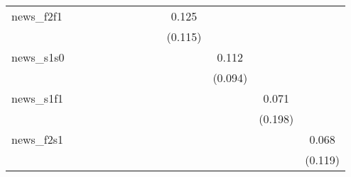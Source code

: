 {\begin{tabular}{l*{12}{c}}
\addlinespace
news\_f2f1   &                     &                     &                     &                     &                     &                     &                     &                     &       0.125         &                     &                     &                     \\
            &                     &                     &                     &                     &                     &                     &                     &                     &     (0.115)         &                     &                     &                     \\
\addlinespace
news\_s1s0   &                     &                     &                     &                     &                     &                     &                     &                     &                     &       0.112         &                     &                     \\
            &                     &                     &                     &                     &                     &                     &                     &                     &                     &     (0.094)         &                     &                     \\
\addlinespace
news\_s1f1   &                     &                     &                     &                     &                     &                     &                     &                     &                     &                     &       0.071         &                     \\
            &                     &                     &                     &                     &                     &                     &                     &                     &                     &                     &     (0.198)         &                     \\
\addlinespace
news\_f2s1   &                     &                     &                     &                     &                     &                     &                     &                     &                     &                     &                     &       0.068         \\
            &                     &                     &                     &                     &                     &                     &                     &                     &                     &                     &                     &     (0.119)         \\

\end{tabular}}
